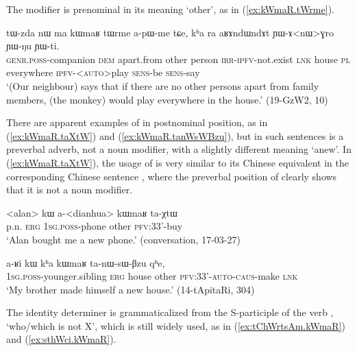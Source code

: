 The modifier  is prenominal in its meaning `other', as in (\ref{ex:kWmaR.tWrme}). 

\begin{exe}
\ex \label{ex:kWmaR.tWrme}
\gll tɯ-zda nɯ ma kɯmaʁ tɯrme a-pɯ-me tɕe, kʰa ra aʁɤndɯndɤt ɲɯ-ɤ<nɯ>ɣro ɲɯ-ŋu ɲɯ-ti. \\
\textsc{genr}.\textsc{poss}-companion \textsc{dem} apart.from other person \textsc{irr}-\textsc{ipfv}-not.exist \textsc{lnk} house \textsc{pl} everywhere \textsc{ipfv}-<\textsc{auto}>play \textsc{sens}-be \textsc{sens}-say \\
\glt `(Our neighbour) says that if there are no other persons apart from family members, (the monkey) would play everywhere in the house.' (19-GzW2, 10)
\end{exe}

There are apparent examples of  in postnominal position, as in (\ref{ex:kWmaR.taXtW}) and (\ref{ex:kWmaR.tanWsWBzu}), but in such sentences  is a preverbal adverb, not a noun modifier, with a slightly different meaning `anew'. In (\ref{ex:kWmaR.taXtW}), the usage of  is very similar to its Chinese equivalent  in the corresponding Chinese sentence , where the preverbal position of  clearly shows that it is not a noun modifier. 

\begin{exe}
\ex \label{ex:kWmaR.taXtW}
\gll <alan> kɯ a-<dianhua> kɯmaʁ ta-χtɯ \\
p.n. \textsc{erg} \textsc{1sg}.\textsc{poss}-phone other \textsc{pfv}:3\fl{}3'-buy \\
\glt `Alan bought me a new phone.' (conversation, 17-03-27)
\end{exe}

\begin{exe}
\ex \label{ex:kWmaR.tanWsWBzu}
\gll a-ʁi kɯ kʰa kɯmaʁ ta-nɯ-sɯ-βzu qʰe, \\
\textsc{1sg}.\textsc{poss}-younger.sibling \textsc{erg} house other \textsc{pfv}:3\fl{}3'-\textsc{auto}-\textsc{caus}-make \textsc{lnk} \\
\glt `My brother made himself a new house.' (14-tApitaRi, 304)
\end{exe}

The identity determiner  is grammaticalized from the S-participle of the verb ,  `who/which is not X', which is still widely used, as in (\ref{ex:tChWrtsAm.kWmaR}) and (\ref{ex:sthWci.kWmaR}).



